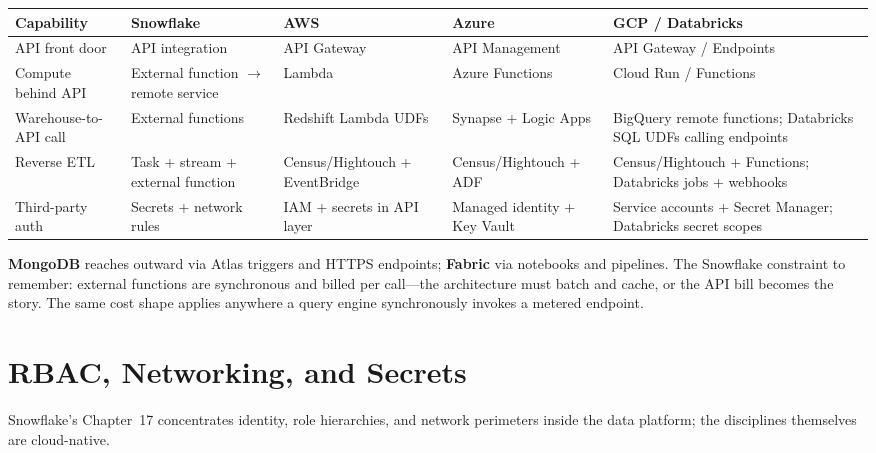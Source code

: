 \begin{center}
\footnotesize
\begin{tabular}{@{}p{2.5cm}p{2.9cm}p{2.7cm}p{2.9cm}p{2.9cm}@{}}
\toprule
\textbf{Capability} & \textbf{Snowflake} & \textbf{AWS} & \textbf{Azure} & \textbf{GCP / Databricks} \\
\midrule
API front door & API integration & API Gateway & API Management & API Gateway / Endpoints \\
Compute behind API & External function $\rightarrow$ remote service & Lambda & Azure Functions & Cloud Run / Functions \\
Warehouse-to-API call & External functions & Redshift Lambda UDFs & Synapse + Logic Apps & BigQuery remote functions; Databricks SQL UDFs calling endpoints \\
Reverse ETL & Task + stream + external function & Census/Hightouch + EventBridge & Census/Hightouch + ADF & Census/Hightouch + Functions; Databricks jobs + webhooks \\
Third-party auth & Secrets + network rules & IAM + secrets in API layer & Managed identity + Key Vault & Service accounts + Secret Manager; Databricks secret scopes \\
\bottomrule
\end{tabular}
\end{center}

\noindent \textbf{MongoDB} reaches outward via Atlas triggers and HTTPS endpoints;
\textbf{Fabric} via notebooks and pipelines. The Snowflake constraint to remember: external
functions are synchronous and billed per call---the architecture must batch and cache, or the
API bill becomes the story. The same cost shape applies anywhere a query engine synchronously
invokes a metered endpoint.

\section{RBAC, Networking, and Secrets}
%
Snowflake's Chapter~17 concentrates identity, role hierarchies, and network perimeters inside
the data platform; the disciplines themselves are cloud-native.

